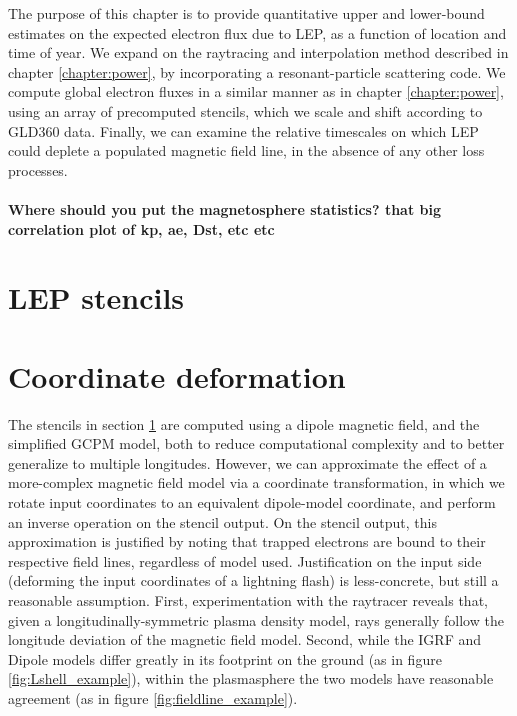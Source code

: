 The purpose of this chapter is to provide quantitative upper and lower-bound estimates on the expected electron flux due to LEP, as a function of location and time of year. We expand on the raytracing and interpolation method described in chapter \ref{chapter:power}, by incorporating a resonant-particle scattering code. We compute global electron fluxes in a similar manner as in chapter \ref{chapter:power}, using an array of precomputed stencils, which we scale and shift according to GLD360 data. Finally, we can examine the relative timescales on which LEP could deplete a populated magnetic field line, in the absence of any other loss processes.





\paragraph{Where should you put the magnetosphere statistics? that big correlation plot of kp, ae, Dst, etc etc}

\section{LEP stencils}
\label{section:lep_stencils}
\section{Coordinate deformation}
The stencils in section \ref{section:lep_stencils} are computed using a dipole magnetic field, and the simplified GCPM model, both to reduce computational complexity and to better generalize to multiple longitudes. However, we can approximate the effect of a more-complex magnetic field model via a coordinate transformation, in which we rotate input coordinates to an equivalent dipole-model coordinate, and perform an inverse operation on the stencil output. On the stencil output, this approximation is justified by noting that trapped electrons are bound to their respective field lines, regardless of model used. Justification on the input side (deforming the input coordinates of a lightning flash) is less-concrete, but still a reasonable assumption. First, experimentation with the raytracer reveals that, given a longitudinally-symmetric plasma density model, rays generally follow the longitude deviation of the magnetic field model. Second, while the IGRF and Dipole models differ greatly in its footprint on the ground (as in figure \ref{fig:Lshell_example}), within the plasmasphere the two models have reasonable agreement (as in figure \ref{fig:fieldline_example}).

